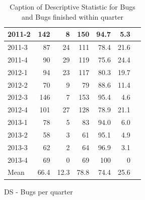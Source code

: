 \documentclass[UKenglish]{ifimaster}  %
\begin{document}
\begin{appendices}
\begin{table}[!htbp]
\begin{adjustwidth}{-2.5cm}{}
\begin{subfigure}[b]{0.4\textwidth}
{\begin{tabular}{ | l | r | r | r | r | r | r | }
2011-2 & 142 & 8 & 150 & 94.7 & 5.3\\ \hline
2011-3 & 87 & 24 & 111 & 78.4 & 21.6\\ \hline
2011-4 & 90 & 29 & 119 & 75.6 & 24.4 \\ \hline
2012-1 & 94 & 23 & 117 & 80.3 & 19.7 \\ \hline
2012-2 & 70 & 9 & 79 & 88.6 & 11.4\\ \hline
2012-3 & 146 & 7 & 153 & 95.4 & 4.6\\ \hline
2012-4 & 101 & 27 & 128 & 78.9& 21.1 \\ \hline
2013-1 & 78 & 5 & 83 & 94.0 & 6.0 \\ \hline
2013-2 & 58 & 3 & 61 & 95.1 & 4.9 \\ \hline
2013-3 & 62 & 2 & 64 & 96.9 & 3.1 \\ \hline
2013-4 & 69 & 0 & 69 & 100 & 0 \\ \hline
Mean & 66.4&12.3&78.8&74.4&25.6 \\ \hline
\end{tabular}
}
\caption{DS - Bugs per quarter}
 \label{DS:FTPQ:2}
\end{subfigure}
\end{adjustwidth}
\caption[Optional caption for list of figures]{Caption of Descriptive Statistic for Bugs and Bugs finished within quarter }
\label{DS:2:5} %
\end{table}
 




\end{appendices}
\end{document}

